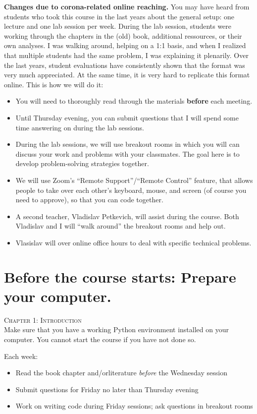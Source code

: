 \begin{corona}\textbf{Changes due to corona-related online reaching.} You may have heard from students who took this course in the last years about the general setup: one lecture and one lab session per week. During the lab session, students were working through the chapters in the (old) book,  additional ressources, or their own analyses. I was walking around, helping on a 1:1 basis, and when I realized that multiple students had the same problem, I was explaining it plenarily. Over the last years, student evaluations have consistently shown that the format was very much appreciated. At the same time, it is very hard to replicate this format online.
	This is how we will do it:

	\begin{itemize}
		\item You will need to thoroughly read through the materials \textbf{before} each meeting.
		\item Until Thursday evening, you can submit questions that I will spend some time answering on during the lab sessions.
		\item During the lab sessions, we will use breakout rooms in which you will can discuss your work and problems with your classmates. The goal here is to develop problem-solving strategies together.
		\item We will use Zoom's ``Remote Support''/``Remote Control'' feature, that allows people to take over each other's keyboard, mouse, and screen (of course you need to approve), so that you can code together.
		\item A second teacher, Vladislav Petkevich, will assist during the course. Both Vladislav and I will ``walk around'' the breakout rooms and help out.
		\item Vlasislav will over online office hours to deal with specific technical problems.
	\end{itemize}
\end{corona}

\section*{Before the course starts: Prepare your computer.}
\textsc{ Chapter 1: Introduction}\\
Make sure that you have a working Python environment installed on your computer. You cannot start the course if you have not done so.

\begin{corona}
	Each week:
	\begin{itemize}
		\item Read the book chapter and/orliterature \emph{before} the Wednesday session
		\item Submit questions for Friday no later than Thursday evening
		\item Work on writing code during Friday sessions; ask questions in breakout rooms
	\end{itemize}
\end{corona}

